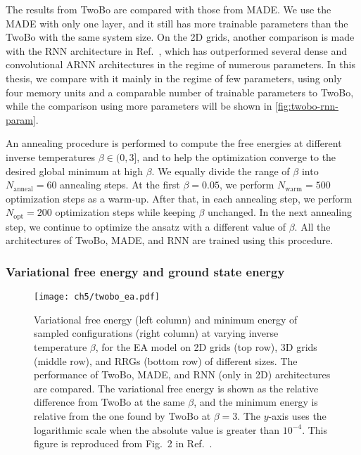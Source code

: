 The results from TwoBo are compared with those from MADE. We use the MADE with only one layer, and it still has more trainable parameters than the TwoBo with the same system size. On the 2D grids, another comparison is made with the RNN architecture in Ref.~\cite{hibat2021variational}, which has outperformed several dense and convolutional ARNN architectures in the regime of numerous parameters. In this thesis, we compare with it mainly in the regime of few parameters, using only four memory units and a comparable number of trainable parameters to TwoBo, while the comparison using more parameters will be shown in \cref{fig:twobo-rnn-param}.

An annealing procedure is performed to compute the free energies at different inverse temperatures $\beta \in (0, 3]$, and to help the optimization converge to the desired global minimum at high $\beta$. We equally divide the range of $\beta$ into $N_\text{anneal} = 60$ annealing steps. At the first $\beta = 0.05$, we perform $N_\text{warm} = 500$ optimization steps as a warm-up. After that, in each annealing step, we perform $N_\text{opt} = 200$ optimization steps while keeping $\beta$ unchanged. In the next annealing step, we continue to optimize the ansatz with a different value of $\beta$. All the architectures of TwoBo, MADE, and RNN are trained using this procedure.

\subsubsection{Variational free energy and ground state energy}

\begin{figure}[htb]
\centering
\texttt{[image: ch5/twobo\_ea.pdf]}
\caption[TwoBo results of Edwards--Anderson (EA) model]{
Variational free energy (left column) and minimum energy of sampled configurations (right column) at varying inverse temperature $\beta$, for the EA model on 2D grids (top row), 3D grids (middle row), and RRGs (bottom row) of different sizes.
The performance of TwoBo, MADE, and RNN (only in 2D) architectures are compared.
The variational free energy is shown as the relative difference from TwoBo at the same $\beta$, and the minimum energy is relative from the one found by TwoBo at $\beta = 3$.
The $y$-axis uses the logarithmic scale when the absolute value is greater than $10^{-4}$.
This figure is reproduced from Fig.~2 in Ref.~\cite{biazzo2024sparse}.
}
\label{fig:twobo-ea}
\end{figure}

